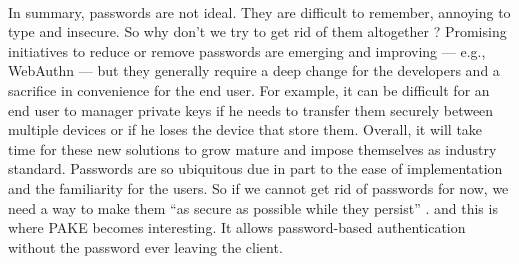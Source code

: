 ﻿\documentclass[../report.tex]{subfiles}
\begin{document}
\paragraph{}
In summary, passwords are not ideal. They are difficult to remember, annoying to type and insecure.
So why don't we try to get rid of them altogether ?
Promising initiatives to reduce or remove passwords are emerging and improving --- e.g., WebAuthn ---
but they generally require a deep change for the developers and a sacrifice in convenience for the end user.
For example, it can be difficult for an end user to manager private keys if he needs to transfer them securely between multiple devices or if he loses the device that store them.
Overall, it will take time for these new solutions to grow mature and impose themselves as industry standard.
Passwords are so ubiquitous due in part to the ease of implementation and the familiarity for the users.
So if we cannot get rid of passwords for now, we need a way to make them ``as secure as possible while they persist'' \cite{PAKE_Cloudflare_blog}.
and this is where PAKE becomes interesting. It allows password-based authentication without the password ever leaving the client.


\paragraph{}
% 
\end{document}
